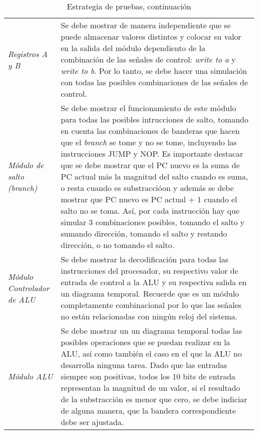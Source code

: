 \begin{table}[h]
\begin{tabularx}{\textwidth}{l X}

{\it Registros A y B}                     & Se debe mostrar de manera independiente que se puede almacenar valores distintos y colocar su valor en la salida del m\' odulo dependiento de la combinaci\' on de las se\~ nales de control: \textit{write to a} y \textit{write to b}. Por lo tanto, se debe hacer una simulaci\' on con todas las posibles combinaciones de las se\~ nales de control.            \\
{\it M\' odulo de salto (branch)}         & Se debe mostrar el funcionamiento de este m\' odulo para todas las posibles intrucciones de salto, tomando en cuenta las combinaciones de banderas que hacen que el \textit{branch} se tome y no se tome, incluyendo las instrucciones JUMP y NOP. Es importante destacar que se debe mostrar que el PC nuevo es la suma de PC actual m\' as la magnitud del salto cuando es suma, o resta cuando es substracci\' oon y adem\' as se debe mostrar que PC nuevo es PC actual + 1 cuando el salto no se toma. As\' i, por cada instrucci\' on hay que simular 3 combinaciones posibles, tomando el salto y sumando direcci\' on, tomando el salto y restando direcci\' on, o no tomando el salto.                   \\


{\it M\' odulo Controlador de ALU}        & Se debe mostrar la decodificaci\' on para todas las instrucciones del procesador, su respectivo valor de entrada de control a la ALU y su respectiva salida en un diagrama temporal. Recuerde que es un m\' odulo completamente combinacional por lo que las se\~ nales no est\' an relacionadas con ning\' un reloj del sistema. \\
{\it M\' odulo ALU}                       & Se debe mostrar un un diagrama temporal todas las posibles operaciones que se puedan realizar en la ALU, as\' i como tambi\' en el caso en el que la ALU no desarrolla ninguna tarea. Dado que las entradas siempre son positivas, todos los 10 bits de entrada representan la magnitud de un valor, si el resultado de la substracci\' on es menor que cero, se debe indiciar de alguna manera,  que la bandera correspondiente debe ser ajustada.                                                    \\                                                
\end{tabularx}
\caption{Estrategia de pruebas, continuaci\' on}
\label{tab:estrategia1}
\end{table}

